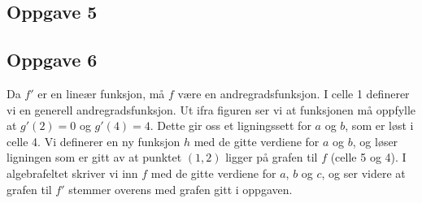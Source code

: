 \newpage
\subsection*{Oppgave 5}

\newpage
\subsection*{Oppgave 6}
Da $ f' $ er en lineær funksjon, må $ f $ være en andregradsfunksjon. I celle 1 definerer vi en generell andregradsfunksjon. Ut ifra figuren ser vi at funksjonen må oppfylle at $ g'(2)=0 $ og $ g'(4)=4 $. Dette gir oss et ligningssett for $ a $ og $ b $, som er løst i celle 4. Vi definerer en ny funksjon $ h $ med de gitte verdiene for $ a $ og $ b $, og løser ligningen som er gitt av at punktet $ (1, 2) $ ligger på grafen til $ f $ (celle 5 og 4). I algebrafeltet skriver vi inn $ f $ med de gitte verdiene for $ a $, $ b $ og $ c $, og ser videre at grafen til $ f' $ stemmer overens med grafen gitt i oppgaven.
 
